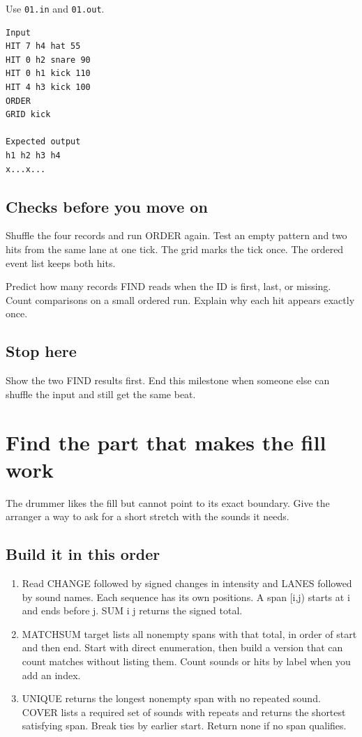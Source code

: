 \documentclass[11pt,letterpaper]{article}
\begin{document}
Use \texttt{01.in} and \texttt{01.out}.

\begin{samepage}
\small
\begin{verbatim}
Input
HIT 7 h4 hat 55
HIT 0 h2 snare 90
HIT 0 h1 kick 110
HIT 4 h3 kick 100
ORDER
GRID kick

Expected output
h1 h2 h3 h4
x...x...
\end{verbatim}
\end{samepage}

\subsection*{Checks before you move on}

Shuffle the four records and run ORDER again. Test an empty pattern and two hits from the same lane at one tick. The grid marks the tick once. The ordered event list keeps both hits.

Predict how many records FIND reads when the ID is first, last, or missing. Count comparisons on a small ordered run. Explain why each hit appears exactly once.

\subsection*{Stop here}

Show the two FIND results first. End this milestone when someone else can shuffle the input and still get the same beat.

\clearpage

\section{Find the part that makes the fill work}\label{groovebox:02}

The drummer likes the fill but cannot point to its exact boundary. Give the arranger a way to ask for a short stretch with the sounds it needs.

\subsection*{Build it in this order}

\begin{enumerate}
\item Read CHANGE followed by signed changes in intensity and LANES followed by sound names. Each sequence has its own positions. A span [i,j) starts at i and ends before j. SUM i j returns the signed total.
\item MATCHSUM target lists all nonempty spans with that total, in order of start and then end. Start with direct enumeration, then build a version that can count matches without listing them. Count sounds or hits by label when you add an index.
\item UNIQUE returns the longest nonempty span with no repeated sound. COVER lists a required set of sounds with repeats and returns the shortest satisfying span. Break ties by earlier start. Return none if no span qualifies.
\end{enumerate}
\end{document}
